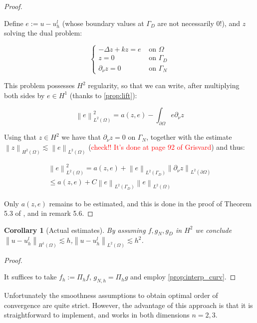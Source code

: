 \documentclass[english,a4paper,10pt,oneside]{scrbook}	%
\theoremstyle{break}
\newtheorem{cor}[equation]{Corollary}
\newenvironment{mproof}[1][\proofname]{%
  \begin{proof}[#1]$ $\par\nobreak\ignorespaces
}{%
  \end{proof}
}
\renewcommand*{\proofname}{Proof}
\theoremstyle{remark}
\newcommand{\norm}[1]{\left\lVert#1\right\rVert}
\begin{document}
\begin{mproof}

Define $e:=u-u_h^l$ (whose boundary values at $\Gamma_D$ are not necessarily $0$!), and $z$ solving the dual problem:

$$
\left\{\begin{matrix}
-\Delta z + k z = e & \text{ on } \Omega \\ 
z = 0 & \text{ on } \Gamma_D \\ 
\partial_\nu z = 0 & \text{ on } \Gamma_N 
\end{matrix}\right.
$$

This problem possesses $H^2$ regularity, so that we can write, after multiplying both sides by $e \in H^1$ (thanks to \cref{prop:lift}):

$$\norm{e}^2_{L^2(\Omega)} = a(z,e) - \int_{\partial \Omega} e \partial_\nu z  $$

Using that $z \in H^2$ we have that $\partial_\nu z=0$ on $\Gamma_N$, together with the estimate $\norm{z}_{H^2(\Omega)}\lesssim \norm{e}_{L^2(\Omega)}$ (\textcolor{red}{check!! It's done at page 92 of Grisvard}) and thus:

\begin{align*}
\norm{e}^2_{L^2(\Omega)} = a(z,e) +\norm{e}_{L^2(\Gamma_D)}\norm{ \partial_\nu z}_{L^2(\partial \Omega)} \\
\leq a(z,e) + C \norm{e}_{L^2(\Gamma_D)}\norm{e}_{L^2( \Omega)}
\end{align*}

Only $ a(z,e)$ remains to be estimated, and this is done in the proof of Theorem 5.3 of \cite{edelmann}, and in remark 5.6.

\end{mproof}

\begin{cor}[Actual estimates]
By assuming $f,g_N, g_D$ in $H^2$ we conclude $\norm{u-u_h^l}_{H^1(\Omega)} \lesssim h$,$ \norm{u-u_h^l}_{L^2(\Omega)} \lesssim h^2$.
\end{cor}

\begin{mproof}
It suffices to take $f_h:=\Pi_h f$, $g_{N,h} = \Pi_h g$ and employ \cref{prop:interp_curv}.
\end{mproof}

Unfortunately the smoothness assumptions to obtain optimal order of convergence are quite strict. However, the advantage of this approach is that it is straightforward to implement, and works in both dimensions $n=2,3$.
\end{document}
